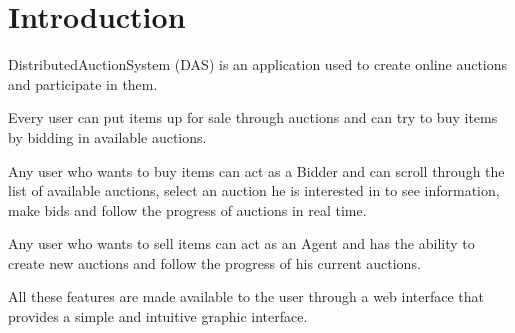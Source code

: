 \section{Introduction}

DistributedAuctionSystem (DAS) is an application used to create online auctions
and participate in them.

Every user can  put items up for sale through auctions and can try to buy items
by bidding in available auctions.

Any user who wants to buy items can act as a Bidder and can scroll through the
list of available auctions, select an auction he is interested in to see
information, make bids and follow the progress of auctions in real time.

Any user who wants to sell items can act as an Agent and has the ability to
create new auctions and follow the progress of his current auctions.

All these features are made available to the user through a web interface that
provides a simple and intuitive graphic interface.
